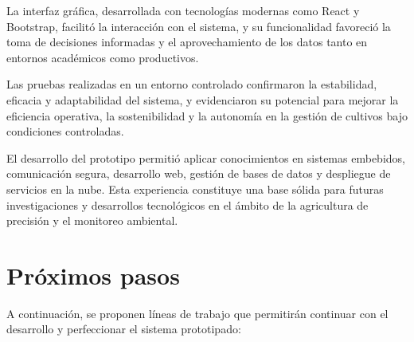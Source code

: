 La interfaz gráfica, desarrollada con tecnologías modernas como React y
Bootstrap, facilitó la interacción con el sistema, y su funcionalidad favoreció
la toma de decisiones informadas y el aprovechamiento de los datos tanto en
entornos académicos como productivos.

Las pruebas realizadas en un entorno controlado confirmaron la estabilidad,
eficacia y adaptabilidad del sistema, y evidenciaron su potencial para mejorar
la eficiencia operativa, la sostenibilidad y la autonomía en la gestión de
cultivos bajo condiciones controladas.

El desarrollo del prototipo permitió aplicar conocimientos en sistemas
embebidos, comunicación segura, desarrollo web, gestión de bases de datos y
despliegue de servicios en la nube. Esta experiencia constituye una base sólida
para futuras investigaciones y desarrollos tecnológicos en el ámbito de la
agricultura de precisión y el monitoreo ambiental.

\section{Próximos pasos}

A continuación, se proponen líneas de trabajo que permitirán continuar con el
desarrollo y perfeccionar el sistema prototipado:

